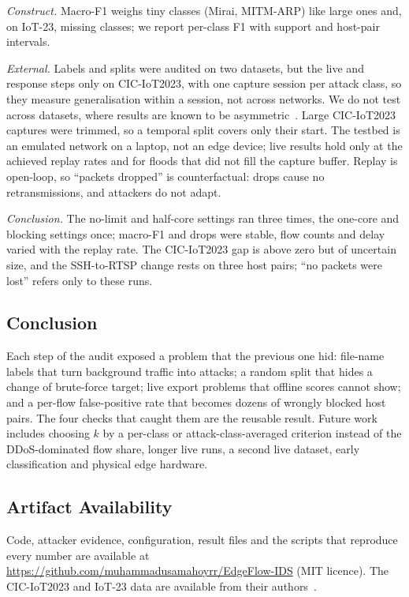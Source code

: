 \emph{Construct.} Macro-F1 weighs tiny classes (Mirai, MITM-ARP) like large ones and, on IoT-23, missing classes; we report per-class F1 with support and host-pair intervals.

\emph{External.} Labels and splits were audited on two datasets, but the live and response steps only on CIC-IoT2023, with one capture session per attack class, so they measure generalisation within a session, not across networks. We do not test across datasets, where results are known to be asymmetric~\cite{ali2026siamxbert}. Large CIC-IoT2023 captures were trimmed, so a temporal split covers only their start. The testbed is an emulated network on a laptop, not an edge device; live results hold only at the achieved replay rates and for floods that did not fill the capture buffer. Replay is open-loop, so ``packets dropped'' is counterfactual: drops cause no retransmissions, and attackers do not adapt.

\emph{Conclusion.} The no-limit and half-core settings ran three times, the one-core and blocking settings once; macro-F1 and drops were stable, flow counts and delay varied with the replay rate. The CIC-IoT2023 gap is above zero but of uncertain size, and the SSH-to-RTSP change rests on three host pairs; ``no packets were lost'' refers only to these runs.

\subsection{Conclusion}

Each step of the audit exposed a problem that the previous one hid: file-name labels that turn background traffic into attacks; a random split that hides a change of brute-force target; live export problems that offline scores cannot show; and a per-flow false-positive rate that becomes dozens of wrongly blocked host pairs. The four checks that caught them are the reusable result. Future work includes choosing $k$ by a per-class or attack-class-averaged criterion instead of the DDoS-dominated flow share, longer live runs, a second live dataset, early classification and physical edge hardware.

\subsection{Artifact Availability}

Code, attacker evidence, configuration, result files and the scripts that reproduce every number are available at \url{https://github.com/muhammadusamahoyrr/EdgeFlow-IDS} (MIT licence). The CIC-IoT2023 and IoT-23 data are available from their authors~\cite{neto2023ciciot2023,garcia2020iot23}.
